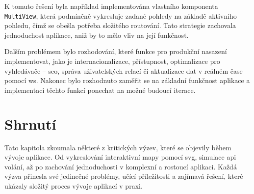 K tomuto řešení byla například implementována vlastního komponenta \texttt{MultiView}, která podmíněně vykresluje zadané pohledy na základě aktivního pohledu, čímž se obešla potřeba složitého routování.
Tato strategie zachovala jednoduchost aplikace, aniž by to mělo vliv na její funkčnost.

Dalším problémem bylo rozhodování, které funkce pro produkční nasazení implementovat, jako je internacionalizace, přístupnost, optimalizace pro vyhledávače – \ac{seo}, správa uživatelských relací či aktualizace dat v reálném čase pomocí \ac{ws}\cite{mdn_api_websockets_api}.
Nakonec bylo rozhodnuto zaměřit se na základní funkčnost aplikace a implementaci těchto funkcí ponechat na možné budoucí iterace.

\section{Shrnutí}
\label{sec:vyzvy-a-problemy-shrnuti}
Tato kapitola zkoumala některé z kritických výzev, které se objevily během vývoje aplikace.
Od vykreslování interaktivní mapy pomocí \ac{svg}, simulace \ac{api} volání, až po zachování jednoduchosti v komplexní a rostoucí aplikaci.
Každá výzva přinesla své jedinečné problémy, učící příležitosti a zajímavá řešení, které ukázaly složitý proces vývoje aplikací v praxi.
